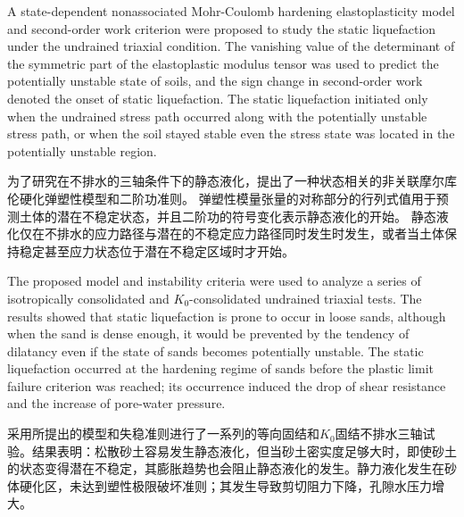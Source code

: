 \begin{ParaColumn}

    A state-dependent nonassociated Mohr-Coulomb hardening elastoplasticity model and second-order work criterion were proposed to study the static liquefaction under the undrained triaxial condition. The vanishing value of the determinant of the symmetric part of the elastoplastic modulus tensor was used to predict the potentially unstable state of soils, and the sign change in second-order work denoted the onset of static liquefaction. The static liquefaction initiated only when the undrained stress path occurred along with the potentially unstable stress path, or when the soil stayed stable even the stress state was located in the potentially unstable region.

    \switchcolumn

    为了研究在不排水的三轴条件下的静态液化，提出了一种状态相关的非关联摩尔库伦硬化弹塑性模型和二阶功准则。 弹塑性模量张量的对称部分的行列式值用于预测土体的潜在不稳定状态，并且二阶功的符号变化表示静态液化的开始。 静态液化仅在不排水的应力路径与潜在的不稳定应力路径同时发生时发生，或者当土体保持稳定甚至应力状态位于潜在不稳定区域时才开始。

    \switchcolumn*

    The proposed model and instability criteria were used to analyze a series of isotropically consolidated and $K_0$-consolidated undrained triaxial tests. The results showed that static liquefaction is prone to occur in loose sands, although when the sand is dense enough, it would be prevented by the tendency of dilatancy even if the state of sands becomes potentially unstable. The static liquefaction occurred at the hardening regime of sands before the plastic limit failure criterion was reached; its occurrence induced the drop of shear resistance and the increase of pore-water pressure.

    \switchcolumn

    采用所提出的模型和失稳准则进行了一系列的等向固结和$K_0$固结不排水三轴试验。结果表明：松散砂土容易发生静态液化，但当砂土密实度足够大时，即使砂土的状态变得潜在不稳定，其膨胀趋势也会阻止静态液化的发生。静力液化发生在砂体硬化区，未达到塑性极限破坏准则；其发生导致剪切阻力下降，孔隙水压力增大。
\end{ParaColumn}